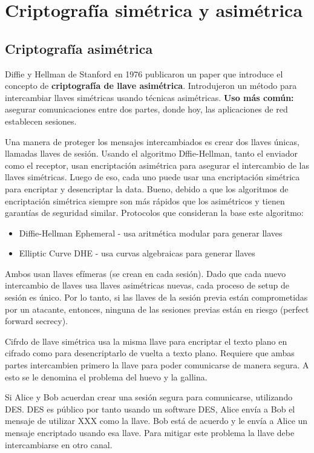  





\section{Criptografía simétrica y asimétrica}
\subsection{Criptografía asimétrica}
Diffie y Hellman de Stanford en 1976 publicaron un paper que introduce el concepto de \textbf{criptografía de llave asimétrica}. Introdujeron un método para intercambiar llaves simétricas usando técnicas asimétricas. \textbf{Uso más común:} asegurar comunicaciones entre dos partes, donde hoy, las aplicaciones de red establecen sesiones. 

Una manera de proteger los mensajes intercambiados es crear dos llaves únicas, llamadas llaves de sesión. Usando el algoritmo Dffie-Hellman, tanto el enviador como el receptor, usan encriptación asimétrica para asegurar el intercambio de las llaves simétricas. Luego de eso, cada uno puede usar una encriptación simétrica para encriptar y desencriptar la data. Bueno, debido a que los algoritmos de encriptación simétrica siempre son más rápidos que los asimétricos y tienen garantías de seguridad similar. Protocolos que consideran la base este algoritmo: 
\begin{itemize}
    \item Diffie-Hellman Ephemeral - usa aritmética modular para generar llaves
    \item Elliptic Curve DHE - usa curvas algebraicas para generar llaves
    
\end{itemize}
Ambos usan llaves efímeras (se crean en cada sesión). Dado que cada nuevo intercambio de llaves usa llaves asimétricas nuevas, cada proceso de setup de sesión es único. Por lo tanto, si las llaves de la sesión previa están comprometidas por un atacante, entonces, ninguna de las sesiones previas están en riesgo (perfect forward secrecy).

Cifrdo de llave simétrica usa la misma llave para encriptar el texto plano en cifrado como para desencriptarlo de vuelta a texto plano. Requiere que ambas partes intercambien primero la llave para poder comunicarse de manera segura. A esto se le denomina el problema del huevo y la gallina.

Si Alice y Bob acuerdan crear una sesión segura para comunicarse, utilizando DES. DES es público por tanto usando un software DES, Alice envía a Bob el mensaje de utilizar XXX como la llave. Bob está de acuerdo y le envía a Alice un mensaje encriptado usando esa llave. Para mitigar este problema la llave debe intercambiarse en otro canal.


